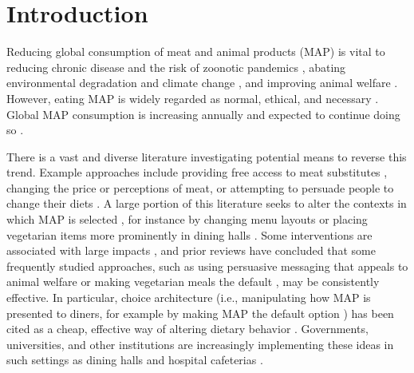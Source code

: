 \documentclass[sn-nature,referee,pdflatex]{sn-jnl}
\begin{document}
\maketitle

\section{Introduction}\label{sec1}

Reducing global consumption of meat and animal products (MAP) is vital
to reducing chronic disease and the risk of zoonotic pandemics
\citep{willett2019, landry2023, hafez2020}, abating environmental
degradation and climate change
\citep{poore2018, koneswaran2008, greger2010}, and improving animal
welfare \citep{kuruc2023, scherer2019}. However, eating MAP is widely
regarded as normal, ethical, and necessary
\citep{piazza2022, milford2019}. Global MAP consumption is increasing
annually \citep{godfray2018} and expected to continue doing so
\citep{whitton2021}.

There is a vast and diverse literature investigating potential means to
reverse this trend. Example approaches include providing free access to
meat substitutes \citep{katare2023}, changing the price
\citep{horgen2002} or perceptions \citep{kunst2016} of meat, or
attempting to persuade people to change their diets
\citep{bianchi2018conscious}. A large portion of this literature seeks
to alter the contexts in which MAP is selected
\citep{bianchi2018restructuring}, for instance by changing menu layouts
\citep{bacon2018, gravert2021} or placing vegetarian items more
prominently in dining halls \citep{ginn2024}. Some interventions are
associated with large impacts
\citep{hansen2021, boronowsky2022, reinders2017}, and prior reviews have
concluded that some frequently studied approaches, such as using
persuasive messaging that appeals to animal welfare
\citep{mathur2021meta} or making vegetarian meals the default
\citep{meier2022}, may be consistently effective. In particular, choice
architecture (i.e., manipulating how MAP is presented to diners, for
example by making MAP the default option \citep{andersson2021}) has been
cited as a cheap, effective way of altering dietary behavior
\citep{colgan2024}. Governments, universities, and other institutions
are increasingly implementing these ideas in such settings as dining
halls \citep{pollicino2024} and hospital cafeterias
\citep{morgenstern2024}.
\end{document}
